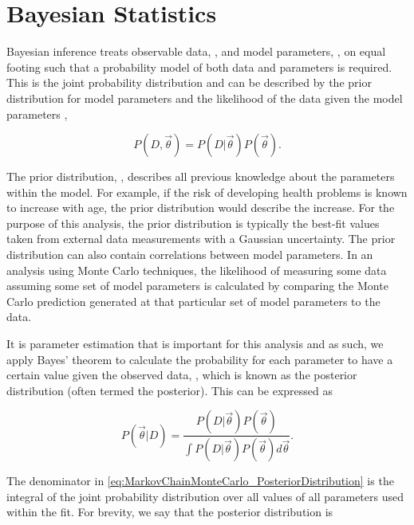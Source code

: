 
\section{Bayesian Statistics}
\label{sec:MarkovChainMonteCarlo_BayesianStatistics}

Bayesian inference treats observable data, , and model parameters, \quickmath{\vec{\theta}}, on equal footing such that a probability model of both data and parameters is required. This is the joint probability distribution  and can be described by the prior distribution for model parameters  and the likelihood of the data given the model parameters ,

\begin{equation}
  P(D,\vec{\theta}) = P(D|\vec{\theta})P(\vec{\theta}).
\end{equation}

The prior distribution, , describes all previous knowledge about the parameters within the model. For example, if the risk of developing health problems is known to increase with age, the prior distribution would describe the increase. For the purpose of this analysis, the prior distribution is typically the best-fit values taken from external data measurements with a Gaussian uncertainty. The prior distribution can also contain correlations between model parameters. In an analysis using Monte Carlo techniques, the likelihood of measuring some data assuming some set of model parameters is calculated by comparing the Monte Carlo prediction generated at that particular set of model parameters to the data.

It is parameter estimation that is important for this analysis and as such, we apply Bayes' theorem \cite{Bayes:1764vd} to calculate the probability for each parameter to have a certain value given the observed data, , which is known as the posterior distribution (often termed the posterior). This can be expressed as

\begin{equation}
  \label{eq:MarkovChainMonteCarlo_PosteriorDistribution}
  P(\vec{\theta}|D) = \frac{ P(D|\vec{\theta}) P(\vec{\theta}) }{\int P(D|\vec{\theta}) P(\vec{\theta}) d\vec{\theta}}.
\end{equation}

The denominator in \autoref{eq:MarkovChainMonteCarlo_PosteriorDistribution} is the integral of the joint probability distribution over all values of all parameters used within the fit. For brevity, we say that the posterior distribution is

